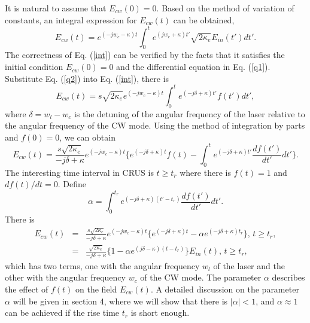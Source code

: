 \documentclass[aps,onecolumn,superscriptaddress,showpacs]{revtex4}
\begin{document}
It is natural to assume that $E_{cw}(0)=0$. Based on the method of variation of constants, an integral expression for $E_{cw}(t)$ can be obtained,
\begin{equation}
E_{cw}(t)=e^{(-jw_c-\kappa)t}\int_0^t e^{(jw_c+\kappa)t'}\sqrt{2\kappa_e}E_{in}(t')dt'. \label{int}
\end{equation}
The correctness of Eq. (\ref{int}) can be verified by the facts that it satisfies the initial condition $E_{cw}(0)=0$ and the differential equation in Eq. (\ref{q1}).
Substitute Eq. (\ref{q2}) into Eq. (\ref{int}), there is
\begin{equation}
E_{cw}(t)=s\sqrt{2\kappa_e} e^{(-jw_c-\kappa)t} \int_0^t e^{(-j\delta+\kappa)t'}f(t')dt',
\end{equation}
where $\delta=w_l-w_c$ is the detuning of the angular frequency of the laser relative to the angular frequency of the CW mode.
Using the method of integration by parts and $f(0)=0$, we can obtain
\begin{equation}
E_{cw}(t)=\frac{s\sqrt{2\kappa_e}}{-j\delta+\kappa} e^{(-jw_c-\kappa)t} \{e^{(-j\delta+\kappa)t}f(t)-\int_0^t e^{(-j\delta+\kappa)t'}\frac{df(t')}{dt'}dt' \}.
\end{equation}
The interesting time interval in CRUS is $t\geq t_r$ where there is $f(t)=1$ and $df(t)/dt=0$. Define
\begin{equation}
\alpha=\int_{0}^{t_r} e^{(-j\delta+\kappa)(t'-t_r)}\frac{df(t')}{dt'} dt'. \label{alpha}
\end{equation}
There is
\begin{eqnarray}
E_{cw}(t)&=&\frac{s\sqrt{2\kappa_e}}{-j\delta+\kappa} e^{(-jw_c-\kappa)t} \{e^{(-j\delta+\kappa)t}-\alpha e^{(-j\delta+\kappa) t_r} \},\,t\geq t_r, \\
        &=&\frac{\sqrt{2\kappa_e}}{-j\delta+\kappa}  \{1-\alpha e^{(j\delta-\kappa) (t-t_r)} \}E_{in}(t),\,t\geq t_r,  \label{qcw}
\end{eqnarray}
which has two terms, one with the angular frequency $w_l$ of the laser and the other with the angular frequency $w_c$ of the CW mode.
The parameter $\alpha$
describes
the effect of $f(t)$ on the field $E_{cw}(t)$.
A  detailed discussion on the parameter $\alpha$ will be given in section 4,
where we will show that there is $|\alpha|<1$, and $\alpha \approx 1$ can be achieved if the rise time $t_r$ is short enough.
\end{document}
